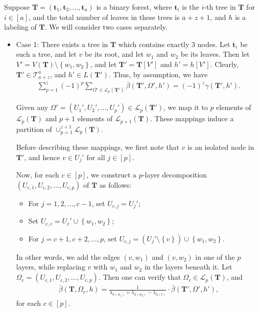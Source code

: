 \documentclass[superscriptaddress,onecolumn,nofootinbib,longbibliography,a4paper,accepted=2026-09-29]{quantumarticle}
\theoremstyle{plain}
\theoremstyle{definition}
\numberwithin{thm}{section}
\numberwithin{assumption}{section}
\numberwithin{lemma}{section}
\numberwithin{prop}{section}
\numberwithin{cor}{section}
\numberwithin{definition}{section}
\numberwithin{rmk}{section}
\numberwithin{equation}{section}
\newcommand{\lrcb}[1]{\left \{ #1 \right \}}
\newcommand{\mbt}{\mathbf{t}}
\newcommand{\mbf}{\mathbf{T}}
\begin{document}
Suppose $\mbf=(\mbt_1,\mbt_2,\dots,\mbt_a)$ is a binary forest, where $\mbt_i$ is the $i$-th tree in $\mbf$ for $i \in [a]$, and the total number of leaves in these trees is $a+z+1$, and $h$ is a labeling of $\mbf$. We will consider two cases separately.
\begin{itemize}
\item Case 1: There exists a tree in $\mbf$ which contains exactly $3$ nodes. Let $\mbt_i$ be such a tree, and let $v$ be its root, and let $w_1$ and $w_2$ be its leaves. Then let $V'=V(\mbf) \setminus \lrcb{w_1, w_2}$, and let
$\mbf'=\mbf[V']$ and $h'=h[V']$. Clearly, $\mbf' \in \mathcal{T}^{a}_{a+z}$, and $h' \in L(\mbf')$. Thus, by assumption, we have
\begin{align}
\sum_{p=1}^{z} (-1)^p
\sum_{\Omega' \in \mathcal{L}_{p}(\mbf')} 
\bar{\beta}(\mbf', \Omega', h')
= (-1)^{z} \gamma(\mbf', h').
\label{eq:induction_assumption}
\end{align}

Given any $\Omega'=(U_1', U_2', \dots, U_p') \in \mathcal{L}_{p}(\mbf')$, we map it to $p$ elements of $\mathcal{L}_p(\mbf)$ and $p+1$ elements of $\mathcal{L}_{p+1}(\mbf)$. These mappings induce a partition of $\cup_{p=1}^{z+1} \mathcal{L}_{p}(\mbf)$. 

Before describing these mappings, we first note that $v$ is an isolated node in $\mbf'$, and hence $v \in U_j'$ for all $j \in [p]$.

Now, for each $c \in [p]$, we construct a $p$-layer decomposition $(U_{c,1}, U_{c,2}, \dots, U_{c,p})$ of $\mbf$ as follows:
\begin{itemize}
    \item For $j=1,2,\dots,c-1$, set $U_{c,j}=U_j'$;        
    \item Set $U_{c,c}=U_c' \cup \lrcb{w_1, w_2}$;    
    \item For $j=c+1,c+2,\dots,p$, set $U_{c,j}=(U_j' \setminus \lrcb{v}) \cup \lrcb{w_1, w_2}$.
\end{itemize}
In other words, we add the edges $(v, w_1)$ and $(v, w_2)$ in one of the $p$ layers, while replacing $v$ with $w_1$ and $w_2$ in the layers beneath it. Let $\Omega_c = (U_{c,1}, U_{c,2}, \dots, U_{c,p})$. Then one can verify that $\Omega_c  \in \mathcal{L}_p(\mbf)$, and
\begin{align}
\bar{\beta}(\mbf, \Omega_c, h)
=\frac{1}{\lambda_{h(w_1)}+\lambda_{h(w_2)}-\lambda_{h(v)}} \cdot
\bar{\beta}(\mbf', \Omega', h'),
\label{eq:induction_relation1}
\end{align}
for each $c \in [p]$. 


\end{itemize}
\end{document}
